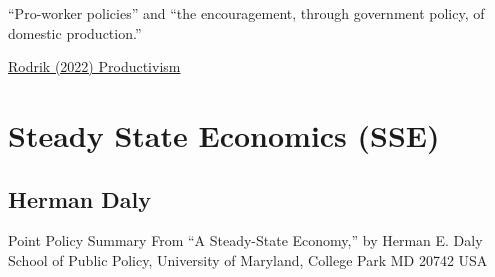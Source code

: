 \documentclass[
]{book}
\begin{document}
``Pro-worker policies'' and ``the encouragement, through government policy, of domestic production.''

\href{https://www.project-syndicate.org/commentary/new-productivism-economic-policy-paradigm-by-dani-rodrik-2022-07}{Rodrik (2022) Productivism}

\hypertarget{steady-state-economics-sse}{%
\chapter{Steady State Economics (SSE)}\label{steady-state-economics-sse}}

\hypertarget{herman-daly}{%
\section{Herman Daly}\label{herman-daly}}

Point Policy Summary
From ``A Steady-State Economy,'' by Herman E. Daly
School of Public Policy, University of Maryland, College Park MD 20742 USA
\end{document}
